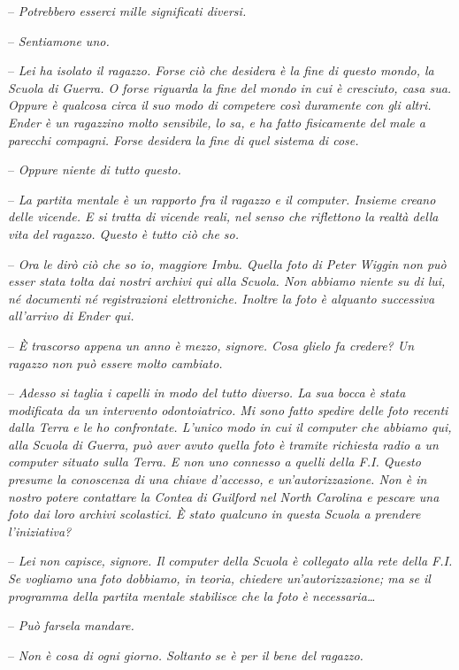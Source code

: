 {-- \emph{Potrebbero esserci mille significati diversi.}}

{-- \emph{Sentiamone uno.}}

{-- \emph{Lei ha isolato il ragazzo. Forse ciò che desidera è la fine di
		questo mondo, la Scuola di Guerra. O forse riguarda la fine del mondo in
		cui è cresciuto, casa sua. Oppure è qualcosa circa il suo modo di
		competere così duramente con gli altri. Ender è un ragazzino molto
		sensibile, lo sa, e ha fatto fisicamente del male a parecchi compagni.
		Forse desidera la fine di quel sistema di cose.}}

{-- \emph{Oppure niente di tutto questo.}}

{-- \emph{La partita mentale è un rapporto fra il ragazzo e il computer.
		Insieme creano delle vicende. E si tratta di vicende reali, nel senso
		che riflettono la realtà della vita del ragazzo. Questo è tutto ciò che
		so.}}

{-- \emph{Ora le dirò ciò che so io, maggiore Imbu. Quella foto di Peter
		Wiggin non può esser stata tolta dai nostri archivi qui alla Scuola. Non
		abbiamo niente su di lui, né documenti né registrazioni elettroniche.
		Inoltre la foto è alquanto successiva all'arrivo di Ender qui.}}

{-- \emph{È trascorso appena un anno è mezzo, signore. Cosa glielo fa
		credere? Un ragazzo non può essere molto cambiato.}}

{-- \emph{Adesso si taglia i capelli in modo del tutto diverso. La sua
		bocca è stata modificata da un intervento odontoiatrico. Mi sono fatto
		spedire delle foto recenti dalla Terra e le ho confrontate. L'unico modo
		in cui il computer che abbiamo qui, alla Scuola di Guerra, può aver
		avuto quella foto è tramite richiesta radio a un computer situato sulla
		Terra. E non uno connesso a quelli della F.I. Questo presume la
		conoscenza di una chiave d'accesso, e un'autorizzazione. Non è in nostro
		potere contattare la Contea di Guilford nel North Carolina e pescare una
		foto dai loro archivi scolastici. È stato qualcuno in questa Scuola a
		prendere l'iniziativa?}}

{-- \emph{Lei non capisce, signore. Il computer della Scuola è collegato
		alla rete della F.I. Se vogliamo una foto dobbiamo, in teoria, chiedere
		un'autorizzazione; ma se il programma della partita mentale stabilisce
		che la foto è necessaria\ldots{}}}

{-- \emph{Può farsela mandare.}}

{-- \emph{Non è cosa di ogni giorno. Soltanto se è per il bene del
		ragazzo.}}

